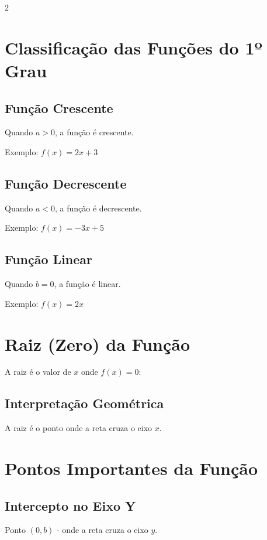 \documentclass[11pt]{article}
\begin{document}
\begin{multicols}{2}
\section*{Classificação das Funções do 1º Grau}

\subsection*{Função Crescente}
Quando $a > 0$, a função é crescente.

Exemplo: $f(x) = 2x + 3$

\subsection*{Função Decrescente}
Quando $a < 0$, a função é decrescente.

Exemplo: $f(x) = -3x + 5$

\subsection*{Função Linear}
Quando $b = 0$, a função é linear.

Exemplo: $f(x) = 2x$

\section*{Raiz (Zero) da Função}

A raiz é o valor de $x$ onde $f(x) = 0$:


\subsection*{Interpretação Geométrica}
A raiz é o ponto onde a reta cruza o eixo $x$.

\section*{Pontos Importantes da Função}

\subsection*{Intercepto no Eixo Y}
Ponto $(0, b)$ - onde a reta cruza o eixo $y$.


\end{multicols}
\end{document}
